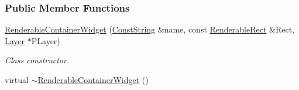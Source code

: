 \subsubsection*{Public Member Functions}
\begin{DoxyCompactItemize}
\item 
\hyperlink{classMezzanine_1_1UI_1_1RenderableContainerWidget_adc5f635cdb48dad33934ff82df3c61f9}{RenderableContainerWidget} (\hyperlink{namespaceMezzanine_a63cd699ac54b73953f35ec9cfc05e506}{ConstString} \&name, const \hyperlink{structMezzanine_1_1UI_1_1RenderableRect}{RenderableRect} \&Rect, \hyperlink{classMezzanine_1_1UI_1_1Layer}{Layer} $\ast$PLayer)
\begin{DoxyCompactList}\small\item\em Class constructor. \item\end{DoxyCompactList}\item 
\hypertarget{classMezzanine_1_1UI_1_1RenderableContainerWidget_aa714e0983c31452f7f9aebf7932262cb}{
virtual \hyperlink{classMezzanine_1_1UI_1_1RenderableContainerWidget_aa714e0983c31452f7f9aebf7932262cb}{$\sim$RenderableContainerWidget} ()}
\label{classMezzanine_1_1UI_1_1RenderableContainerWidget_aa714e0983c31452f7f9aebf7932262cb}


\end{DoxyCompactItemize}
